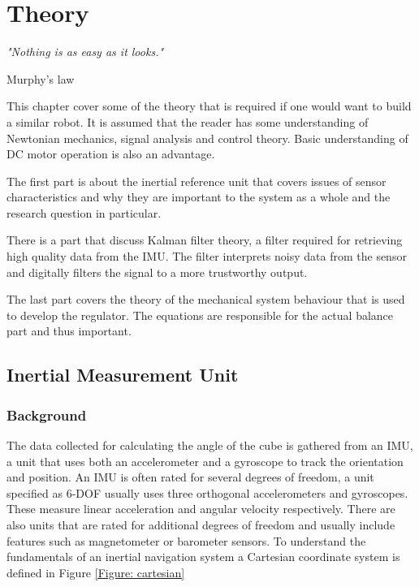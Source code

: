 \documentclass[a4paper,11pt]{kth-mag}
\begin{document}
\chapter{Theory} \label{chapter: theory}
\epigraph{\textit{"Nothing is as easy as it looks."}}{Murphy's law}
This chapter cover some of the theory that is required if one would want to build a similar robot. It is assumed that the reader has some understanding of Newtonian mechanics, signal analysis and control theory. Basic understanding of DC motor operation is also an advantage.

The first part is about the inertial reference unit that covers issues of sensor characteristics and why they are important to the system as a whole and the research question in particular.

There is a part that discuss Kalman filter theory, a filter required for retrieving high quality data from the IMU. The filter interprets noisy data from the sensor and digitally filters the signal to a more trustworthy output. 

The last part covers the theory of the mechanical system behaviour that is used to develop the regulator. The equations are responsible for the actual balance part and thus important. 

\section{Inertial Measurement Unit} \label{section:IMU}
\subsection{Background}
The data collected for calculating the angle of the cube is gathered from an IMU, a unit that uses both an accelerometer and a gyroscope to track the orientation and position. An IMU is often rated for several degrees of freedom, a unit specified as 6-DOF usually uses three orthogonal accelerometers and gyroscopes. These measure linear acceleration and angular velocity respectively. There are also units that are rated for additional degrees of freedom and usually include features such as magnetometer or barometer sensors.   
To understand the fundamentals of an inertial navigation system a Cartesian coordinate system is defined in Figure \ref{Figure: cartesian}
\end{document}
